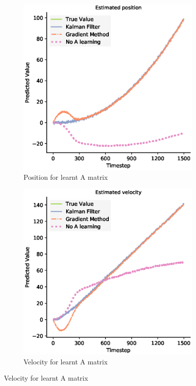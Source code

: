 \begin{figure}[H]
\label{KF_learn_AB_figure}
  \begin{subfigure}{0.33\textwidth}
    \centering
    \includegraphics[width=.8\linewidth]{chapter_3_figures/Estimated_position_A_matrix.eps}
    \caption{Position for learnt A matrix}
  \end{subfigure}%
  \begin{subfigure}{0.33\textwidth}
    \centering
    \includegraphics[width=.8\linewidth]{chapter_3_figures/Estimated_velocity_A_matrix.eps}
    \caption{Velocity for learnt A matrix}
  \end{subfigure}

\end{figure}
